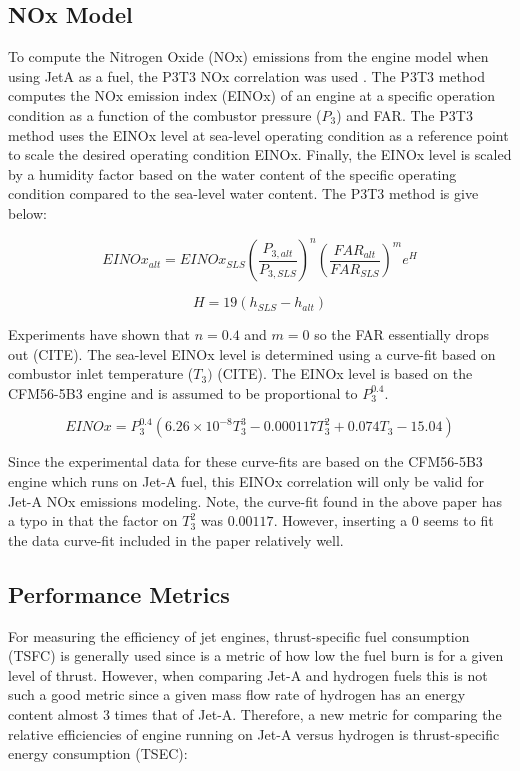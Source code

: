 \documentclass[12pt]{new-aiaa}
\begin{document}
\subsection{NOx Model}
To compute the Nitrogen Oxide (NOx) emissions from the engine model when using JetA as a fuel, the P3T3 NOx correlation was used \cite{Voet2021}.
The P3T3 method computes the NOx emission index (EINOx) of an engine at a specific operation condition as a function of the combustor pressure ($P_3$) and FAR.
The P3T3 method uses the EINOx level at sea-level operating condition as a reference point to scale the desired operating condition EINOx.
Finally, the EINOx level is scaled by a humidity factor based on the water content of the specific operating condition compared to the sea-level water content.
The P3T3 method is give below:

\begin{equation}
    EINOx_{alt} = EINOx_{SLS} \left(\frac{P_{3,alt}}{P_{3,SLS}}\right)^n \left(\frac{FAR_{alt}}{FAR_{SLS}}\right)^m e^{H}
\end{equation}

\begin{equation}
    H = 19 (h_{SLS} - h_{alt})
\end{equation}

\noindent
Experiments have shown that $n=0.4$ and $m=0$ so the FAR essentially drops out (CITE).
The sea-level EINOx level is determined using a curve-fit based on combustor inlet temperature ($T_3)$ (CITE).
The EINOx level is based on the CFM56-5B3 engine and is assumed to be proportional to $P_3^{0.4}$.

\begin{equation}
    EINOx = P_3^{0.4} (6.26 \times 10^{-8}T_3^3 - 0.000117 T_3^2 + 0.074 T_3 - 15.04)
\end{equation}

\noindent
Since the experimental data for these curve-fits are based on the CFM56-5B3 engine which runs on Jet-A fuel, this EINOx correlation will only be valid for Jet-A NOx emissions modeling.
Note, the curve-fit found in the above paper has a typo in that the factor on $T_3^2$ was $0.00117$.
However, inserting a 0 seems to fit the data curve-fit included in the paper relatively well.

\subsection{Performance Metrics}
For measuring the efficiency of jet engines, thrust-specific fuel consumption (TSFC) is generally used since is a metric of how low the fuel burn is for a given level of thrust.
However, when comparing Jet-A and hydrogen fuels this is not such a good metric since a given mass flow rate of hydrogen has an energy content almost 3 times that of Jet-A.
Therefore, a new metric for comparing the relative efficiencies of engine running on Jet-A versus hydrogen is thrust-specific energy consumption (TSEC):
\end{document}
